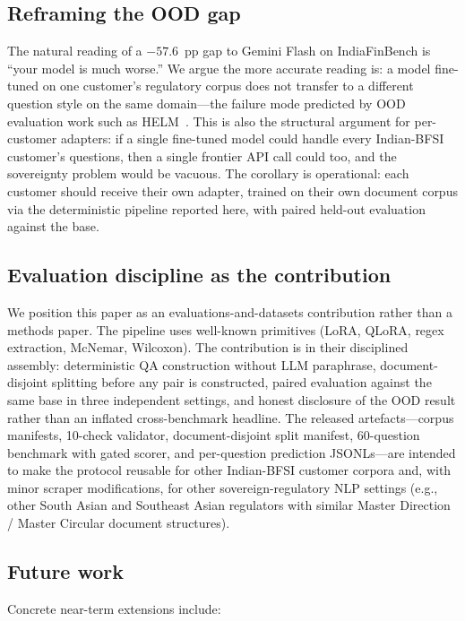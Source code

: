 \documentclass{article}
\begin{document}
\subsection{Reframing the OOD gap}

The natural reading of a $-57.6$~pp gap to Gemini Flash on IndiaFinBench is ``your model is much worse.'' We argue the more accurate reading is: a model fine-tuned on one customer's regulatory corpus does not transfer to a different question style on the same domain---the failure mode predicted by OOD evaluation work such as HELM~\citep{liang2022helm}. This is also the structural argument for per-customer adapters: if a single fine-tuned model could handle every Indian-BFSI customer's questions, then a single frontier API call could too, and the sovereignty problem would be vacuous. The corollary is operational: each customer should receive their own adapter, trained on their own document corpus via the deterministic pipeline reported here, with paired held-out evaluation against the base.

\subsection{Evaluation discipline as the contribution}

We position this paper as an evaluations-and-datasets contribution rather than a methods paper. The pipeline uses well-known primitives (LoRA, QLoRA, regex extraction, McNemar, Wilcoxon). The contribution is in their disciplined assembly: deterministic QA construction without LLM paraphrase, document-disjoint splitting before any pair is constructed, paired evaluation against the same base in three independent settings, and honest disclosure of the OOD result rather than an inflated cross-benchmark headline. The released artefacts---corpus manifests, 10-check validator, document-disjoint split manifest, 60-question benchmark with gated scorer, and per-question prediction JSONLs---are intended to make the protocol reusable for other Indian-BFSI customer corpora and, with minor scraper modifications, for other sovereign-regulatory NLP settings (e.g., other South Asian and Southeast Asian regulators with similar Master Direction / Master Circular document structures).

\subsection{Future work}

Concrete near-term extensions include:
\end{document}
